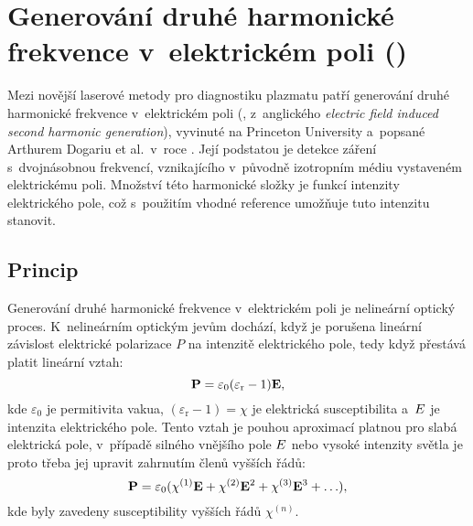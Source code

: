 \chapter[\EFISH]{Generování druhé harmonické frekvence
	v~elektrickém poli (\EFISH)}
\label{sec:efishth}

\newcommand\epol{P}
\newcommand\epolsh{P^{\mathnormal{(2\angfreq)}}}
\newcommand\esus{\chi}
\newcommand\esusn[1]{\esus^{(#1)}}
\newcommand\eper{\varepsilon}
\newcommand\epervac{\eper_0}
\newcommand\eperrel{\eper_\text{r}}
\newcommand\elfieldext{E_\text{ext}}
\newcommand\elfieldlaser{E^{(\mathnormal\angfreq)}}
\newcommand\efishconst{A}
\newcommand\itylaser{I_\text{laser}}

Mezi novější laserové metody pro diagnostiku plazmatu patří
generování druhé harmonické frekvence v~elektrickém poli (\EFISH{},
z~anglického \emph{electric field induced second harmonic generation}),
vyvinuté na Princeton University a~popsané
Arthurem Dogariu et al.~v~roce \citeyear{efish-original}.
\autocite{efish-original}
Její podstatou je detekce záření s~dvojnásobnou frekvencí, vznikajícího
v~původně izotropním médiu vystaveném elektrickému poli.
Množství této harmonické složky je funkcí intenzity elektrického pole,
což s~použitím vhodné reference umožňuje tuto intenzitu stanovit.

\section{Princip}
\label{sec:efishth-principle}
Generování druhé harmonické frekvence v~elektrickém poli
je nelineární optický proces.
K~nelineárním optickým jevům dochází, když je porušena lineární závislost
elektrické polarizace $\epol$ na intenzitě elektrického pole,
tedy když přestává platit lineární vztah:
\begin{equation}
	\label{eq:efishth-epol-linear}
	\vec\epol = \epervac (\eperrel - 1) \vec\elfield,
\end{equation}
kde $\epervac$ je permitivita vakua,
$(\eperrel - 1) = \esus$ je elektrická susceptibilita
a~$E$ je intenzita elektrického pole.
Tento vztah je pouhou aproximací platnou pro slabá elektrická pole,
v~případě silného vnějšího pole $E$ nebo vysoké intenzity světla
je proto třeba jej upravit zahrnutím členů vyšších řádů:
\begin{equation}
	\label{eq:efishth-epol-general}
	\vec\epol = \epervac (\esusn1\vec\elfield + \esusn2\vec\elfield^2
		+ \esusn3\vec\elfield^3 + \ldots),
\end{equation}
kde byly zavedeny susceptibility vyšších řádů $\esusn{n}$.


